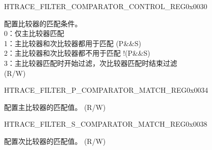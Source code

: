 \addtocounter{Regfloat}{-1}
\begin{register}{H}{TRACE\_FILTER\_COMPARATOR\_CONTROL\_REG}{0x0030}
\begin{regdesc}\begin{reglist}
\item [接上页...]

\label{fielddesc:TRACEMATCHMODE}\item [TRACE\_MATCH\_MODE] 配置比较器的匹配条件。\\
0：仅主比较器匹配\\
1：主比较器和次比较器都用于匹配 (P\&\&S)\\
2：主比较器和次比较器都不用于匹配 !(P\&\&S)\\
3：主比较器匹配时开始过滤，次比较器匹配时结束过滤\\
(R/W)
\end{reglist}\end{regdesc}
\end{register}


\begin{register}{H}{TRACE\_FILTER\_P\_COMPARATOR\_MATCH\_REG}{0x0034}\label{regdesc:TRACEFILTERPCOMPARATORMATCHREG}
%
\regnewline%
\begin{regdesc}\begin{reglist}
\label{fielddesc:TRACEPMATCH}\item [TRACE\_P\_MATCH] 配置主比较器的匹配值。 (R/W)
\end{reglist}\end{regdesc}
\end{register}


\begin{register}{H}{TRACE\_FILTER\_S\_COMPARATOR\_MATCH\_REG}{0x0038}\label{regdesc:TRACEFILTERSCOMPARATORMATCHREG}
%
\regnewline%
\begin{regdesc}\begin{reglist}
\label{fielddesc:TRACESMATCH}\item [TRACE\_S\_MATCH] 配置次比较器的匹配值。 (R/W)
\end{reglist}\end{regdesc}
\end{register}


